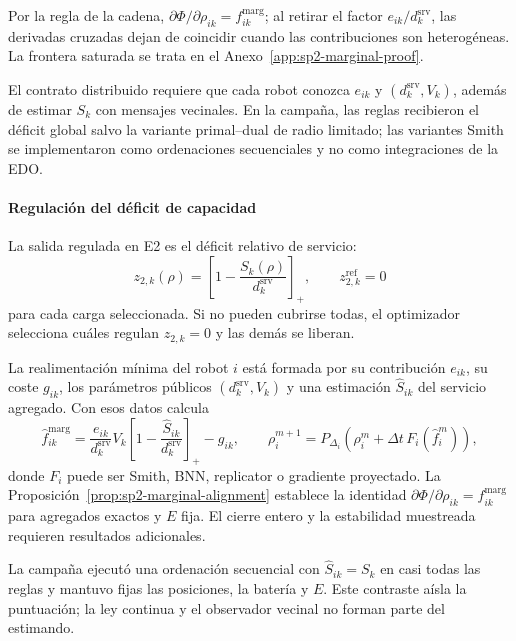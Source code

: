 Por la regla de la cadena, $\partial\Phi/\partial\rho_{ik}=f_{ik}^{\mathrm{marg}}$; al retirar el factor $e_{ik}/d_k^{\mathrm{srv}}$, las derivadas cruzadas dejan de coincidir cuando las contribuciones son heterogéneas. La frontera saturada se trata en el Anexo~\ref{app:sp2-marginal-proof}.

El contrato distribuido requiere que cada robot conozca $e_{ik}$ y $(d_k^{\mathrm{srv}},V_k)$, además de estimar $S_k$ con mensajes vecinales. En la campaña, las reglas recibieron el déficit global salvo la variante primal--dual de radio limitado; las variantes Smith se implementaron como ordenaciones secuenciales y no como integraciones de la EDO.

\paragraph{Regulación del déficit de capacidad}

La salida regulada en E2 es el déficit relativo de servicio:
\begin{equation}
 z_{2,k}(\rho)=
 \left[1-\frac{S_k(\rho)}{d_k^{\mathrm{srv}}}\right]_+,
 \qquad z_{2,k}^{\mathrm{ref}}=0
 \label{eq:sp2-strategic-regulation}
\end{equation}
para cada carga seleccionada. Si no pueden cubrirse todas, el optimizador selecciona cuáles regulan $z_{2,k}=0$ y las demás se liberan.

La realimentación mínima del robot $i$ está formada por su contribución $e_{ik}$, su coste $g_{ik}$, los parámetros públicos $(d_k^{\mathrm{srv}},V_k)$ y una estimación $\widehat S_{ik}$ del servicio agregado. Con esos datos calcula
\begin{equation}
 \widehat f_{ik}^{\mathrm{marg}}
 =\frac{e_{ik}}{d_k^{\mathrm{srv}}}V_k
  \left[1-\frac{\widehat S_{ik}}{d_k^{\mathrm{srv}}}\right]_+-g_{ik},
 \qquad
 \rho_i^{m+1}=P_{\Delta_i}\!\left(
 \rho_i^m+\Delta t\,F_i(\widehat f_i^m)\right),
 \label{eq:sp2-feedback-candidate}
\end{equation}
donde $F_i$ puede ser Smith, BNN, replicator o gradiente proyectado. La Proposición~\ref{prop:sp2-marginal-alignment} establece la identidad $\partial\Phi/\partial\rho_{ik}=f_{ik}^{\mathrm{marg}}$ para agregados exactos y $E$ fija. El cierre entero y la estabilidad muestreada requieren resultados adicionales.

La campaña ejecutó una ordenación secuencial con $\widehat S_{ik}=S_k$ en casi todas las reglas y mantuvo fijas las posiciones, la batería y $E$. Este contraste aísla la puntuación; la ley continua y el observador vecinal no forman parte del estimando.
